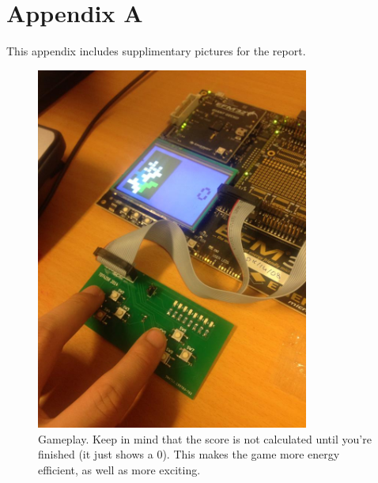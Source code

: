 \section{Appendix A}
\label{appendix:a}

This appendix includes supplimentary pictures for the report.

\begin{figure}[ht!]
    \begin{center}
    \includegraphics[width=0.8\textwidth]{assets/img/stacked1.jpg}
    \caption{Gameplay. Keep in mind that the score is not calculated until you're finished (it just shows a 0). This makes the game more energy efficient, as well as more exciting.}
    \label{fig:gameplay}
    \end{center}
\end{figure}

